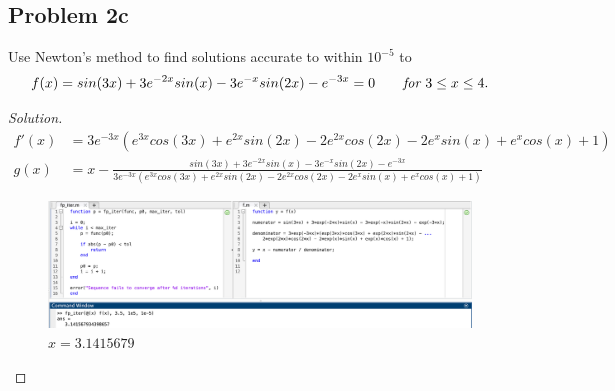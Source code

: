 \documentclass{article}
\begin{document}
\subsection*{Problem 2c}
Use Newton's method to find solutions accurate to within $10^{-5}$ to 
$$f(x)=sin(3x)+3e^{-2x}sin(x)-3e^{-x}sin(2x)-e^{-3x}=0 \qquad \emph{for }3\le x\le 4.$$
\begin{proof}[Solution]
    \begin{align*}
        f'(x) & = 3e^{-3x}\left(e^{3x}cos(3x)+e^{2x}sin(2x)-2e^{2x}cos(2x)-2e^xsin(x)+e^xcos(x)+1
        \right) \\
        g(x) & = x - \frac{sin(3x)+3e^{-2x}sin(x)-3e^{-x}sin(2x)-e^{-3x}}{3e^{-3x}\left(e^{3x}
        cos(3x)+e^{2x}sin(2x)-2e^{2x}cos(2x)-2e^xsin(x)+e^xcos(x)+1\right)}
    \end{align*}
    \begin{figure}[htb!]
        \centering
        \includegraphics[scale=0.3]{2.4.2c.png}
        \caption{$x = 3.1415679$}
    \end{figure}
\end{proof}
\end{document}
